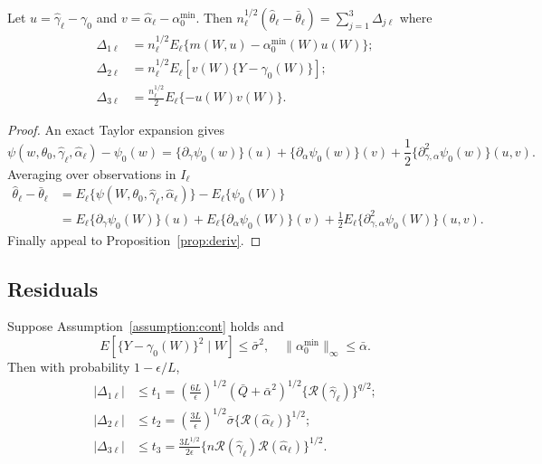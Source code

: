\begin{proposition}\label{prop:Taylor}
Let $u=\hat{\gamma}_{\ell}-\gamma_0$ and $v=\hat{\alpha}_{\ell}-\alpha_0^{\min}$. Then $n_{\ell}^{1/2}(\hat{\theta}_{\ell}-\bar{\theta}_{\ell})=\sum_{j=1}^3 \Delta_{j{\ell}}$ where
\begin{align*}
    \Delta_{1{\ell}}&=n_{\ell}^{1/2}E_{\ell}\{m(W,u)-\alpha_0^{\min}(W)u(W)\}; \\
    \Delta_{2{\ell}}&=n_{\ell}^{1/2}E_{\ell}[v(W)\{Y-\gamma_0(W)\}]; \\
    \Delta_{3{\ell}}&=\frac{n_{\ell}^{1/2}}{2}E_{\ell} \{-u(W)v(W)\}.
\end{align*}
\end{proposition}

\begin{proof}
An exact Taylor expansion gives
$$
\psi(w,\theta_0,\hat{\gamma}_{\ell},\hat{\alpha}_{\ell})-\psi_0(w)
=\{\partial_{\gamma} \psi_0(w)\}(u)+\{\partial_{\alpha} \psi_0(w)\}(v)+\frac{1}{2}\{\partial^2_{\gamma,\alpha} \psi_0(w)\}(u,v).
$$
Averaging over observations in $I_{\ell}$
\begin{align*}
    \hat{\theta}_{\ell}-\bar{\theta}_{\ell}
    &=E_{\ell}\{\psi(W,\theta_0,\hat{\gamma}_{\ell},\hat{\alpha}_{\ell})\}-E_{\ell}\{\psi_0(W)\} \\
    &=E_{\ell}\{\partial_{\gamma} \psi_0(W)\}(u)+E_{\ell}\{\partial_{\alpha} \psi_0(W)\}(v)+\frac{1}{2}E_{\ell}\{\partial^2_{\gamma,\alpha} \psi_0(W)\}(u,v).
\end{align*}
Finally appeal to Proposition~\ref{prop:deriv}.
\end{proof}

\subsection{Residuals}

\begin{proposition}[Residuals]\label{prop:resid}
Suppose Assumption~\ref{assumption:cont} holds and
$$
E[\{Y-\gamma_0(W)\}^2 \mid W ]\leq \bar{\sigma}^2,\quad \|\alpha_0^{\min}\|_{\infty}\leq\bar{\alpha}.
$$
Then with probability $1-\epsilon/L$,
\begin{align*}
    |\Delta_{1\ell}|&\leq t_1=\left(\frac{6L}{\epsilon}\right)^{1/2}(\bar{Q}+\bar{\alpha}^2)^{1/2}\{\mathcal{R}(\hat{\gamma}_{\ell})\}^{q/2}; \\
    |\Delta_{2\ell}|&\leq t_2= \left(\frac{3L}{\epsilon}\right)^{1/2}\bar{\sigma}\{\mathcal{R}(\hat{\alpha}_{\ell})\}^{1/2};\\
    |\Delta_{3\ell}|&\leq t_3= \frac{3L^{1/2}}{2\epsilon}\{n\mathcal{R}(\hat{\gamma}_{\ell})\mathcal{R}(\hat{\alpha}_{\ell})\}^{1/2}.
\end{align*}
\end{proposition}


